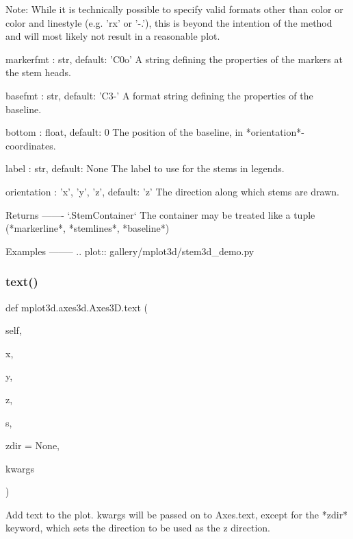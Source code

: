 \begin{DoxyVerb}
\begin{DoxyVerb}
    Note: While it is technically possible to specify valid formats
    other than color or color and linestyle (e.g. 'rx' or '-.'), this
    is beyond the intention of the method and will most likely not
    result in a reasonable plot.

markerfmt : str, default: 'C0o'
    A string defining the properties of the markers at the stem heads.

basefmt : str, default: 'C3-'
    A format string defining the properties of the baseline.

bottom : float, default: 0
    The position of the baseline, in *orientation*-coordinates.

label : str, default: None
    The label to use for the stems in legends.

orientation : {'x', 'y', 'z'}, default: 'z'
    The direction along which stems are drawn.

Returns
-------
`.StemContainer`
    The container may be treated like a tuple
    (*markerline*, *stemlines*, *baseline*)

Examples
--------
.. plot:: gallery/mplot3d/stem3d_demo.py
\end{DoxyVerb}
 \mbox{\label{classmplot3d_1_1axes3d_1_1Axes3D_a64c3ce87e480a1f76cf3857b14985ca7}} 
\subsubsection{\texorpdfstring{text()}{text()}}
{\footnotesize\ttfamily def mplot3d.\+axes3d.\+Axes3\+D.\+text (\begin{DoxyParamCaption}\item[{}]{self,  }\item[{}]{x,  }\item[{}]{y,  }\item[{}]{z,  }\item[{}]{s,  }\item[{}]{zdir = {\ttfamily None},  }\item[{}]{kwargs }\end{DoxyParamCaption})}

\begin{DoxyVerb}Add text to the plot. kwargs will be passed on to Axes.text,
except for the *zdir* keyword, which sets the direction to be
used as the z direction.
\end{DoxyVerb}
 \mbox{\label{classmplot3d_1_1axes3d_1_1Axes3D_a00bb00d8626eb76ff5874b6e7942ae67}} 

\end{DoxyVerb}
